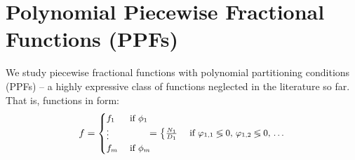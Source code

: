 \documentclass{article}
\newcommand{\case}[2]{#2 &\text{ if } #1}%
\begin{document}
{{%
}

\section{Polynomial Piecewise Fractional Functions (PPFs)}
\label{sect:ppfs}
We study piecewise fractional functions with polynomial partitioning conditions (PPFs) -- a highly expressive class of functions neglected in the literature so far.
That is, functions in form:
\begin{equation}\footnotesize
\label{e:ppf}
f = 
  \begin{cases}
  \case{\phi_1}{f_1}\\
\vdots\\
  \case{\phi_m}{f_m}    
  \end{cases}
\!\!\!=
  \begin{cases}
  \case{\varphi_{1,1} \lessgtr 0,\, \varphi_{1,2} \lessgtr 0,\, \ldots}{\frac{N_1}{D_1}} \\

\end{cases}
\end{equation}}
\end{document}
